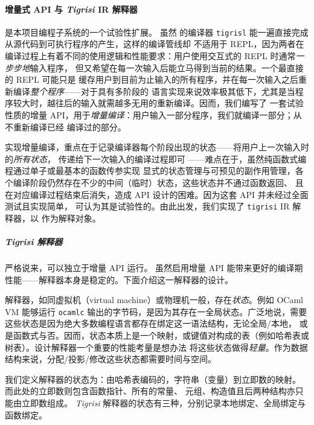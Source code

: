 \paragraph{增量式 API 与 \emph{Tigrisi} IR 解释器} 是本项目编程子系统的一个试验性扩展。
虽然 \Tigris 的编译器 \texttt{tigrisl} 能一遍直接完成从源代码到可执行程序的产生，这样的编译管线却
不适用于 REPL，因为两者在编译过程上有着不同的使用逻辑和性能要求：用户使用交互式的 REPL 时通常\emph{一步步地}输入程序，
但又希望在每一次输入后能立马得到当前的结果。一个最直接的 REPL 可能只是
缓存用户到目前为止输入的所有程序，并在每一次输入之后重新编译\emph{整个程序}——对于具有多阶段的
语言实现来说效率极其低下，尤其是当程序较大时，越往后的输入就需越多无用的重新编译。因而，我们编写了
一套试验性质的增量 API，用于\emph{增量编译}：用户输入一部分程序，我们就编译一部分；从不重新编译已经
编译过的部分。

实现增量编译，重点在于记录编译器每个阶段出现的状态——将用户上一次输入时的\emph{所有状态}，
传递给下一次输入的编译过程即可
——难点在于，虽然纯函数式编程通过单子或最基本的函数传参实现
显式的状态管理与可预见的副作用管理，各个编译阶段仍然存在不少的中间（临时）状态，这些状态并不通过函数返回、
且在对应编译过程结束后消失，造成 API 设计的困难。因为这套 API 并未经过全面测试且实现简单，
可认为其是试验性的。由此出发，我们实现了 \texttt{tigrisi} IR 解释器，以 \Lambdair
作为解释对象。

\subparagraph{\emph{Tigrisi} 解释器} 严格说来，可以独立于增量 API 运行。
虽然启用增量 API 能带来更好的编译期性能——解释器本身是稳定的。下面介绍这一解释器的设计。

解释器，如同虚拟机（virtual machine）或物理机一般，存在\emph{状态}。例如 OCaml VM 能够运行 \texttt{ocamlc}
输出的字节码，是因为其存在一全局状态。广泛地说，需要这些状态是因为绝大多数编程语言都存在绑定这一语法结构，无论全局/本地，
或是函数式与否。因而，状态本质上是一个映射，或键值对构成的表（例如哈希表或树表）。设计解释器一个重要的性能考量是想办法
将这些状态做得\emph{轻量}。作为数据结构来说，分配/投影/修改这些状态都需要时间与空间。

我们定义解释器的状态为：由哈希表编码的，字符串（变量）到立即数的映射。
而此处的立即数则包含函数指针、所有的常量、
元组、构造值且后两种结构亦只能由立即数组成。
\emph{Tigrisi} 解释器的状态有三种，分别记录本地绑定、全局绑定与函数绑定。

\enlargethispage{\baselineskip}

